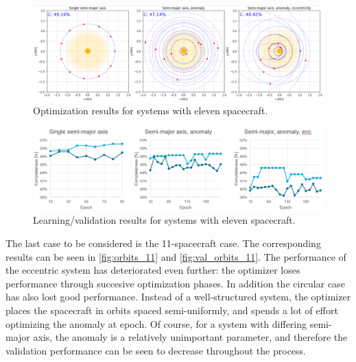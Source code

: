 \begin{figure}[htbp]
 \centering
 \includegraphics[width=1.0\textwidth]{img/orbits_11.png}
 \caption{Optimization results for systems with eleven spacecraft.}
 \label{fig:orbits_11}
\end{figure}
\begin{figure}[htbp]
 \centering
 \includegraphics[width=1.0\textwidth]{img/val_orbits_11.png}
 \caption{Learning/validation results for systems with eleven spacecraft.}
 \label{fig:val_orbits_11}
\end{figure}

The last case to be considered is the 11-spacecraft case. The corresponding results can be seen in \autoref{fig:orbits_11} and \autoref{fig:val_orbits_11}. The performance of the eccentric system has deteriorated even further: the optimizer loses performance through succesive optimization phases. In addition the circular case has also lost good performance. Instead of a well-structured system, the optimizer places the spacecraft in orbits spaced semi-uniformly, and spends a lot of effort optimizing the anomaly at epoch. Of course, for a system with differing semi-major axis, the anomaly is a relatively unimportant parameter, and therefore the validation performance can be seen to decrease throughout the process.\\


